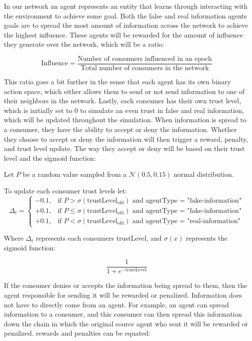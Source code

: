 \documentclass[twoside]{article}
\begin{document}
In our network an agent represents an entity that learns through interacting with the environment to achieve some goal. Both the false and real information agents goals are to spread the most amount of information across the network to achieve the highest influence. These agents will be rewarded for the amount of influence they generate over the network, which will be a ratio:

\[
\text{Influence} = \frac{\text{Number of consumers influenced in an epoch}}{\text{Total number of consumers in the network}}
\]

This ratio goes a bit further in the sense that each agent has its own binary action space, which either allows them to send or not send information to one of their neighbors in the network. Lastly, each consumer has their own trust level, which is initially set to 0 to simulate an even trust in false and real information, which will be updated throughout the simulation. When information is spread to a consumer, they have the ability to accept or deny the information. Whether they choose to accept or deny the information will then trigger a reward, penalty, and trust level update. The way they accept or deny will be based on their trust level and the sigmoid function:

Let $P$ be a random value sampled from a $\mathcal{N}(0.5, 0.15)$ normal distribution.

To update each consumer trust levels let:
\[
\Delta_{t} = 
\begin{cases} 
-0.1, & \text{if } P > \sigma(\text{trustLevel}_{\text{old}}) \text{ and agentType = "fake-information"} \\
+0.1, & \text{if } P \leq \sigma(\text{trustLevel}_{\text{old}}) \text{ and agentType = "fake-information"}\\
+0.1, & \text{if } P < \sigma(\text{trustLevel}_{\text{old}}) \text{ and agentType = "real-information"}
\end{cases}
\]

Where $\Delta_{t}$ represents each consumers trustLevel, and $\sigma(x)$ represents the sigmoid function:

\[
\frac{1}{1 + e^{-\text{trustLevel}}}
\]

If the consumer denies or accepts the information being spread to them, then the agent responsible for sending it will be rewarded or penalized. Information does not have to directly come from an agent. For example, an agent can spread information to a consumer, and this consumer can then spread this information down the chain in which the original source agent who sent it will be rewarded or penalized. rewards and penalties can be equated:
\end{document}

